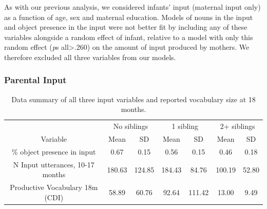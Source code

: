 \documentclass[
  english,
  man,floatsintext]{apa6}
\begin{document}
As with our previous analysis, we considered infants' input (maternal input only) as a function of age, sex and maternal education. Models of nouns in the input and object presence in the input were not better fit by including any of these variables alongside a random effect of infant, relative to a model with only this random effect (\emph{p}s all\textgreater.260) on the amount of input produced by mothers. We therefore excluded all three variables from our models.

\hypertarget{parental-input}{%
\subsubsection{Parental Input}\label{parental-input}}

\begin{table}

\caption{\label{tab:table-data-summary}Data summary of all three input variables and reported vocabulary size at 18 months.}
\centering
\begin{tabular}[t]{ccccccc}
\toprule
\multicolumn{1}{c}{ } & \multicolumn{2}{c}{No siblings} & \multicolumn{2}{c}{1 sibling} & \multicolumn{2}{c}{2+ siblings} \\
\cmidrule(l{3pt}r{3pt}){2-3} \cmidrule(l{3pt}r{3pt}){4-5} \cmidrule(l{3pt}r{3pt}){6-7}
\multicolumn{1}{c}{Variable} & \multicolumn{1}{c}{Mean} & \multicolumn{1}{c}{SD} & \multicolumn{1}{c}{Mean} & \multicolumn{1}{c}{SD} & \multicolumn{1}{c}{Mean} & \multicolumn{1}{c}{SD} \\
\cmidrule(l{3pt}r{3pt}){1-1} \cmidrule(l{3pt}r{3pt}){2-2} \cmidrule(l{3pt}r{3pt}){3-3} \cmidrule(l{3pt}r{3pt}){4-4} \cmidrule(l{3pt}r{3pt}){5-5} \cmidrule(l{3pt}r{3pt}){6-6} \cmidrule(l{3pt}r{3pt}){7-7}
\% object presence in input & 0.67 & 0.15 & 0.56 & 0.15 & 0.46 & 0.18\\
N Input utterances, 10-17 months & 180.63 & 124.85 & 184.43 & 84.76 & 100.19 & 52.80\\
Productive Vocabulary 18m (CDI) & 58.89 & 60.76 & 92.64 & 111.42 & 13.00 & 9.49\\
\bottomrule
\end{tabular}
\end{table}
\end{document}
